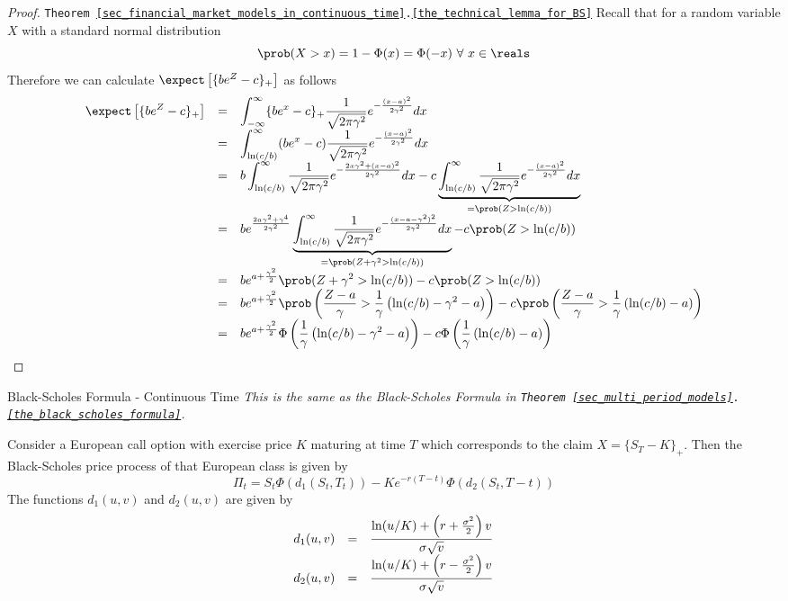 \documentclass[11pt,a4paper]{article}
\begin{document}
  \begin{proof}{\texttt{Theorem \ref{sec_financial_market_models_in_continuous_time}.\ref{the_technical_lemma_for_BS}}}
    Recall that for a random variable $X$ with a standard normal distribution
    \[ \prob(X>x)=1-\Phi(x)=\Phi(-x)\ \forall\ x\in\reals \]
    Therefore we can calculate $\expect\left[\{be^Z-c\}_+\right]$ as follows
    \[\everymath={\displaystyle}\begin{array}{rcl}
      \expect\left[\{be^Z-c\}_+\right]&=&\int_{-\infty}^\infty\{be^x-c\}_+\frac1{\sqrt{2\pi\gamma^2}}e^{-\frac{(x-a)^2}{2\gamma^2}}dx\\
      &=&\int_{\ln(c/b)}^\infty(be^x-c)\frac1{\sqrt{2\pi\gamma^2}}e^{-\frac{(x-a)^2}{2\gamma^2}}dx\\
      &=&b\int_{\ln(c/b)}^\infty\frac1{\sqrt{2\pi\gamma^2}}e^{-\frac{2x\gamma^2+(x-a)^2}{2\gamma^2}}dx-c\underbrace{\int_{\ln(c/b)}^\infty\frac1{\sqrt{2\pi\gamma^2}}e^{-\frac{(x-a)^2}{2\gamma^2}}dx}_{=\prob(Z>\ln(c/b))}\\
      &=&be^{\frac{2a\gamma^2+\gamma^4}{2\gamma^2}}\underbrace{\int_{\ln(c/b)}^\infty\frac1{\sqrt{2\pi\gamma^2}}e^{-\frac{(x-a-\gamma^2)^2}{2\gamma^2}}dx}_{=\prob(Z+\gamma^2>\ln(c/b))}-c\prob(Z>\ln(c/b))\\
      &=&be^{a+\frac{\gamma^2}2}\prob(Z+\gamma^2>\ln(c/b))-c\prob(Z>\ln(c/b))\\
      &=&be^{a+\frac{\gamma^2}2}\prob\left(\frac{Z-a}\gamma>\frac1\gamma\left(\ln(c/b)-\gamma^2-a\right)\right)-c\prob\left(\frac{Z-a}\gamma>\frac1\gamma\left(\ln(c/b)-a\right)\right)\\
      &=&be^{a+\frac{\gamma^2}2}\Phi\left(\frac1\gamma\left(\ln(c/b)-\gamma^2-a\right)\right)-c\Phi\left(\frac1\gamma\left(\ln(c/b)-a\right)\right)\\
    \end{array}\]
    \proved
  \end{proof}

  \begin{proposition}{Black-Scholes Formula - Continuous Time}\label{prop_bs_formula_continuous}
    \textit{This is the same as the Black-Scholes Formula in \texttt{Theorem \ref{sec_multi_period_models}.\ref{the_black_scholes_formula}}.}
    \par Consider a European call option with exercise price $K$ maturing at time $T$ which corresponds to the claim $X=\{S_T-K\}_+$. Then the Black-Scholes price process of that European class is given by
    \[ \Pi_t=S_t\Phi(d_1(S_t,T_t))-Ke^{-r(T-t)}\Phi(d_2(S_t,T-t)) \]
    The functions $d_1(u,v)$ and $d_2(u,v)$ are given by
    \[\everymath={\displaystyle}\begin{array}{rcl}
      d_1(u,v)&=&\frac{\ln(u/K)+\left(r+\frac{\sigma^2}2\right)v}{\sigma\sqrt{v}}\\
      d_2(u,v)&=&\frac{\ln(u/K)+\left(r-\frac{\sigma^2}2\right)v}{\sigma\sqrt{v}}
    \end{array}\]
  \end{proposition}
\end{document}
